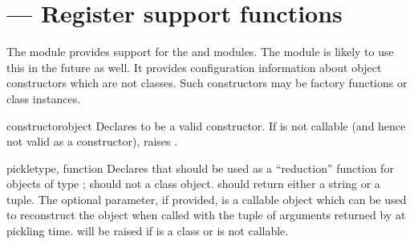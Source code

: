 \section{ ---
         Register  support functions}



The  module provides support for the
 and
 modules.  The
 module is likely to use this in the
future as well.  It provides configuration information about object
constructors which are not classes.  Such constructors may be factory
functions or class instances.


\begin{funcdesc}{constructor}{object}
  Declares  to be a valid constructor.  If  is
  not callable (and hence not valid as a constructor), raises
  .
\end{funcdesc}

\begin{funcdesc}{pickle}{type, function}
  Declares that  should be used as a ``reduction''
  function for objects of type ;  should not a
  class object.   should return either a string or a
  tuple.  The optional  parameter, if provided, is a
  callable object which can be used to reconstruct the object when
  called with the tuple of arguments returned by  at
  pickling time.   will be raised if
   is a class or  is not callable.
\end{funcdesc}
